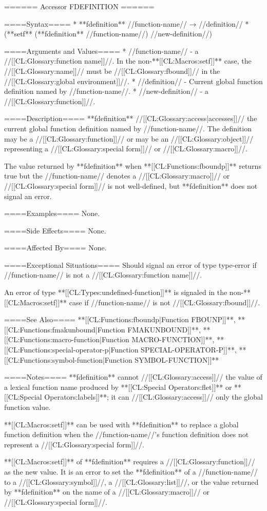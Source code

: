 ====== Accessor FDEFINITION ======

====Syntax====
  * **fdefinition** //function-name// → //definition//
  * (**setf** (**fdefinition** //function-name//) //new-definition//)

====Arguments and Values====
  * //function-name// - a //[[CL:Glossary:function name]]//. In the non-**[[CL:Macros:setf]]** case, the //[[CL:Glossary:name]]// must be //[[CL:Glossary:fbound]]// in the //[[CL:Glossary:global environment]]//.
  * //definition// - Current global function definition named by //function-name//.
  * //new-definition// - a //[[CL:Glossary:function]]//.

====Description====
**fdefinition** //[[CL:Glossary:access|accesses]]// the current global function definition named by //function-name//. The definition may be a //[[CL:Glossary:function]]// or may be an //[[CL:Glossary:object]]// representing a //[[CL:Glossary:special form]]// or //[[CL:Glossary:macro]]//.

The value returned by **fdefinition** when **[[CL:Functions:fboundp]]** returns true but the //function-name// denotes a //[[CL:Glossary:macro]]// or //[[CL:Glossary:special form]]// is not well-defined, but **fdefinition** does not signal an error.

====Examples====
None.

====Side Effects====
None.

====Affected By====
None.

====Exceptional Situations====
Should signal an error of type type-error if //function-name// is not a //[[CL:Glossary:function name]]//.

An error of type **[[CL:Types:undefined-function]]** is signaled in the non-**[[CL:Macros:setf]]** case if //function-name// is not //[[CL:Glossary:fbound]]//.

====See Also====
**[[CL:Functions:fboundp|Function FBOUNP]]**, **[[CL:Functions:fmakunbound|Function FMAKUNBOUND]]**, **[[CL:Functions:macro-function|Function MACRO-FUNCTION]]**, **[[CL:Functions:special-operator-p|Function SPECIAL-OPERATOR-P]]**, **[[CL:Functions:symbol-function|Function SYMBOL-FUNCTION]]**

====Notes====
**fdefinition** cannot //[[CL:Glossary:access]]// the value of a lexical function name produced by **[[CL:Special Operators:flet]]** or **[[CL:Special Operators:labels]]**; it can //[[CL:Glossary:access]]// only the global function value.

**[[CL:Macros:setf]]** can be used with **fdefinition** to replace a global function definition when the //function-name//'s function definition does not represent a //[[CL:Glossary:special form]]//.

**[[CL:Macros:setf]]** of **fdefinition** requires a //[[CL:Glossary:function]]// as the new value. It is an error to set the **fdefinition** of a //function-name// to a //[[CL:Glossary:symbol]]//, a //[[CL:Glossary:list]]//, or the value returned by **fdefinition** on the name of a //[[CL:Glossary:macro]]// or //[[CL:Glossary:special form]]//.

    
